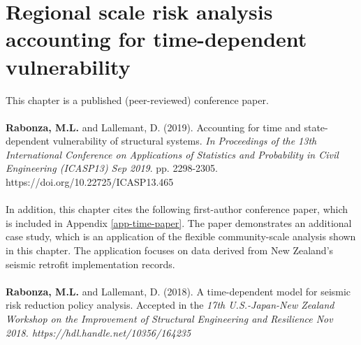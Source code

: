 \setcounter{chapter}{2}
\chapter[Regional scale risk analysis accounting for time-dependent vulnerability]{Regional scale risk analysis accounting for time-dependent vulnerability}\label{chap-time}

\begin{small}
This chapter is a published (peer-reviewed) conference paper. 
\\
\\ \noindent
    \textbf{Rabonza, M.L.} and Lallemant, D. (2019). Accounting for time and state-dependent vulnerability of structural systems. \textit{In Proceedings of the 13th International Conference on Applications of Statistics and Probability in Civil Engineering (ICASP13) Sep 2019}. pp. 2298-2305. https://doi.org/10.22725/ICASP13.465
\\
\\
In addition, this chapter cites the following first-author conference paper, which is included in Appendix \ref{app-time-paper}. The paper demonstrates an additional case study, which is an application of the flexible community-scale analysis shown in this chapter. The application focuses on data derived from New Zealand's seismic retrofit implementation records.
\\
\\
\noindent
\textbf{Rabonza, M.L.} and Lallemant, D. (2018). A time-dependent model for seismic risk reduction policy analysis. Accepted in the \textit{17th U.S.-Japan-New Zealand Workshop on the Improvement of Structural Engineering and Resilience Nov 2018. https://hdl.handle.net/10356/164235}

    




\end{small}
